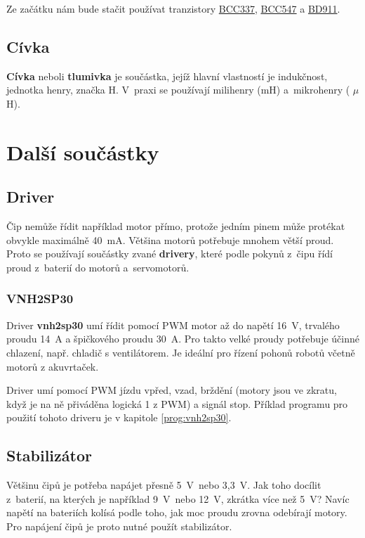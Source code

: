 Ze začátku nám bude stačit používat tranzistory 
\hyperlink{BCC337}{BCC337}, 
\hyperlink{BCC547}{BCC547} a
\hyperlink{BD911}{BD911}. 


\subsection{Cívka}

{\bf Cívka} neboli {\bf tlumivka} je součástka, 
jejíž hlavní vlastností je indukčnost, jednotka henry, značka H.
 V~praxi se používají milihenry (mH) a~mikrohenry ( $\mu$H).

\section{Další součástky}

\subsection{Driver} \label{driver}

Čip nemůže řídit například motor přímo, protože jedním pinem může protékat obvykle maximálně 40~mA. 
Většina motorů potřebuje mnohem větší proud.
 Proto se používají součástky zvané {\bf drivery}, které podle pokynů z~čipu řídí proud z~baterií do motorů a~servomotorů. 
 
\label{vnh2sp30} \subsubsection{VNH2SP30}
 
 Driver {\bf vnh2sp30}  umí řídit pomocí PWM motor až do napětí 16~V, trvalého proudu 14~A a špičkového proudu 30~A. Pro takto velké proudy potřebuje účinné chlazení, např. chladič s ventilátorem. Je ideální pro řízení pohonů robotů včetně motorů z akuvrtaček. 
 
 Driver umí pomocí PWM jízdu vpřed, vzad, brždění (motory jsou ve zkratu, když je na ně přiváděna logická 1 z PWM) a signál stop. Příklad programu pro použití tohoto driveru je v kapitole \ref{prog:vnh2sp30}. 
 

\subsection{Stabilizátor}

Většinu čipů je potřeba napájet přesně 5~V~nebo 3,3~V. Jak toho docílit z~baterií, na kterých je například 9~V~nebo 12~V, zkrátka více než 5~V? 
Navíc napětí na bateriích kolísá podle toho, jak moc proudu zrovna odebírají motory. 
Pro napájení čipů je proto nutné použít stabilizátor. 

